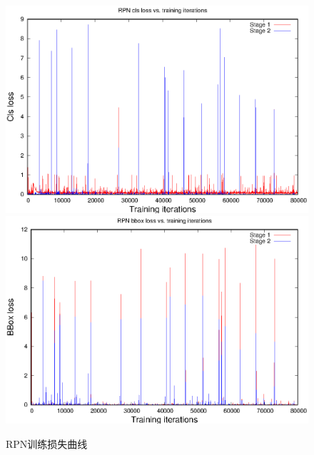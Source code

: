 \begin{figure}[ht]
\centering
{}
{\includegraphics[width=1.0\linewidth]{./Figure/RPNClsLoss.eps}}
{\includegraphics[width=1.0\linewidth]{./Figure/RPNBBoxLoss.eps}}
\caption{RPN训练损失曲线}\label{Fig:RPNloss}
\end{figure}

